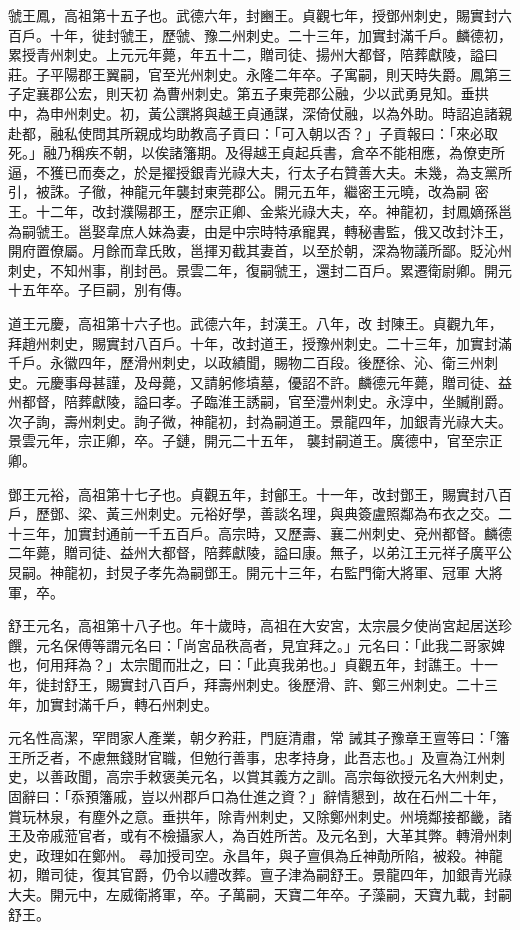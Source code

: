 \begin{pinyinscope}
 虢王鳳，高祖第十五子也。武德六年，封豳王。貞觀七年，授鄧州刺史，賜實封六百戶。十年，徙封虢王，歷虢、豫二州刺史。二十三年，加實封滿千戶。麟德初，累授青州刺史。上元元年薨，年五十二，贈司徒、揚州大都督，陪葬獻陵，謚曰莊。子平陽郡王翼嗣，官至光州刺史。永隆二年卒。子寓嗣，則天時失爵。鳳第三子定襄郡公宏，則天初
 為曹州刺史。第五子東莞郡公融，少以武勇見知。垂拱中，為申州刺史。初，黃公譔將與越王貞通謀，深倚仗融，以為外助。時詔追諸親赴都，融私使問其所親成均助教高子貢曰：「可入朝以否？」子貢報曰：「來必取死。」融乃稱疾不朝，以俟諸籓期。及得越王貞起兵書，倉卒不能相應，為僚吏所逼，不獲已而奏之，於是擢授銀青光祿大夫，行太子右贊善大夫。未幾，為支黨所引，被誅。子徹，神龍元年襲封東莞郡公。開元五年，繼密王元曉，改為嗣
 密王。十二年，改封濮陽郡王，歷宗正卿、金紫光祿大夫，卒。神龍初，封鳳嫡孫邕為嗣虢王。邕娶韋庶人妹為妻，由是中宗時特承寵異，轉秘書監，俄又改封汴王，開府置僚屬。月餘而韋氏敗，邕揮刃截其妻首，以至於朝，深為物議所鄙。貶沁州刺史，不知州事，削封邑。景雲二年，復嗣虢王，還封二百戶。累遷衛尉卿。開元十五年卒。子巨嗣，別有傳。



 道王元慶，高祖第十六子也。武德六年，封漢王。八年，改
 封陳王。貞觀九年，拜趙州刺史，賜實封八百戶。十年，改封道王，授豫州刺史。二十三年，加實封滿千戶。永徽四年，歷滑州刺史，以政績聞，賜物二百段。後歷徐、沁、衛三州刺史。元慶事母甚謹，及母薨，又請躬修墳墓，優詔不許。麟德元年薨，贈司徒、益州都督，陪葬獻陵，謚曰孝。子臨淮王誘嗣，官至澧州刺史。永淳中，坐贓削爵。次子詢，壽州刺史。詢子微，神龍初，封為嗣道王。景龍四年，加銀青光祿大夫。景雲元年，宗正卿，卒。子鏈，開元二十五年，
 襲封嗣道王。廣德中，官至宗正卿。



 鄧王元裕，高祖第十七子也。貞觀五年，封鄶王。十一年，改封鄧王，賜實封八百戶，歷鄧、梁、黃三州刺史。元裕好學，善談名理，與典簽盧照鄰為布衣之交。二十三年，加實封通前一千五百戶。高宗時，又歷壽、襄二州刺史、兗州都督。麟德二年薨，贈司徒、益州大都督，陪葬獻陵，謚曰康。無子，以弟江王元祥子廣平公炅嗣。神龍初，封炅子孝先為嗣鄧王。開元十三年，右監門衛大將軍、冠軍
 大將軍，卒。



 舒王元名，高祖第十八子也。年十歲時，高祖在大安宮，太宗晨夕使尚宮起居送珍饌，元名保傅等謂元名曰：「尚宮品秩高者，見宜拜之。」元名曰：「此我二哥家婢也，何用拜為？」太宗聞而壯之，曰：「此真我弟也。」貞觀五年，封譙王。十一年，徙封舒王，賜實封八百戶，拜壽州刺史。後歷滑、許、鄭三州刺史。二十三年，加實封滿千戶，轉石州刺史。



 元名性高潔，罕問家人產業，朝夕矜莊，門庭清肅，常
 誡其子豫章王亶等曰：「籓王所乏者，不慮無錢財官職，但勉行善事，忠孝持身，此吾志也。」及亶為江州刺史，以善政聞，高宗手敕褒美元名，以賞其義方之訓。高宗每欲授元名大州刺史，固辭曰：「忝預籓戚，豈以州郡戶口為仕進之資？」辭情懇到，故在石州二十年，賞玩林泉，有塵外之意。垂拱年，除青州刺史，又除鄭州刺史。州境鄰接都畿，諸王及帝戚蒞官者，或有不檢攝家人，為百姓所苦。及元名到，大革其弊。轉滑州刺史，政理如在鄭州。
 尋加授司空。永昌年，與子亶俱為丘神勣所陷，被殺。神龍初，贈司徒，復其官爵，仍令以禮改葬。亶子津為嗣舒王。景龍四年，加銀青光祿大夫。開元中，左威衛將軍，卒。子萬嗣，天寶二年卒。子藻嗣，天寶九載，封嗣舒王。




\end{pinyinscope}
